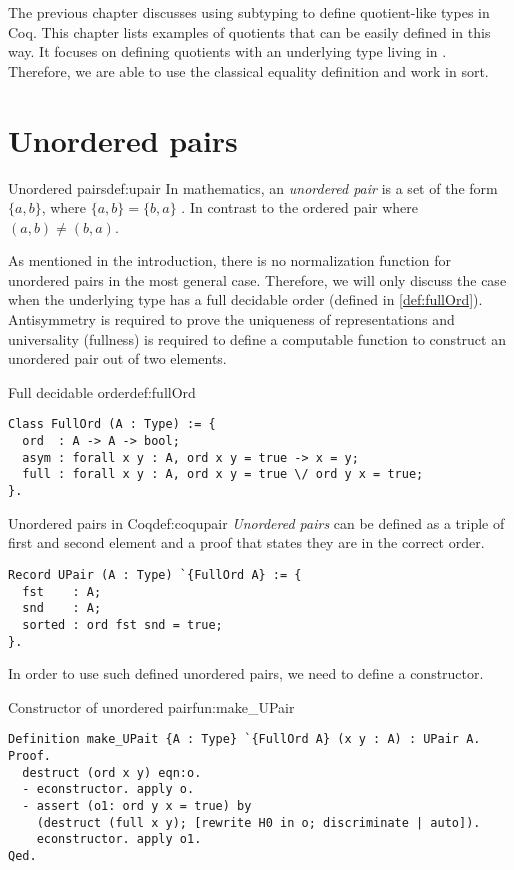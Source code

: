 The previous chapter discusses using subtyping to define quotient-like types in Coq. This chapter lists examples of quotients that can be easily defined in this way. It focuses on defining quotients with an underlying type living in . Therefore, we are able to use the classical equality definition and work in  sort.
\section{Unordered pairs}
\begin{defi}{Unordered pairs}{def:upair}
In mathematics, an \emph{unordered pair} is a set of the form $\{a, b\}$, where $\{a, b\} = \{b, a\}$ \cite{SetTheorey}. In contrast to the ordered pair where $(a, b) \neq (b, a)$.
\end{defi}
As mentioned in the introduction, there is no normalization function for unordered pairs in the most general case. Therefore, we will only discuss the case when the underlying type has a full decidable order (defined in \ref{def:fullOrd}). Antisymmetry is required to prove the uniqueness of representations and universality (fullness) is required to define a computable function to construct an unordered pair out of two elements.
\begin{defi}{Full decidable order}{def:fullOrd}
\begin{verbatim}
Class FullOrd (A : Type) := {
  ord  : A -> A -> bool;
  asym : forall x y : A, ord x y = true -> x = y;
  full : forall x y : A, ord x y = true \/ ord y x = true;
}.
\end{verbatim}
\end{defi}
\begin{defi}{Unordered pairs in Coq}{def:coqupair}
\emph{Unordered pairs} can be defined as a triple of first and second element and a proof that states they are in the correct order.
\begin{verbatim}
Record UPair (A : Type) `{FullOrd A} := {
  fst    : A;
  snd    : A;
  sorted : ord fst snd = true;
}.
\end{verbatim}
\end{defi}
In order to use such defined unordered pairs, we need to define a constructor.
\begin{func}{Constructor of unordered pair}{fun:make_UPair}
\begin{verbatim}
Definition make_UPait {A : Type} `{FullOrd A} (x y : A) : UPair A.
Proof.
  destruct (ord x y) eqn:o. 
  - econstructor. apply o.
  - assert (o1: ord y x = true) by
    (destruct (full x y); [rewrite H0 in o; discriminate | auto]).
    econstructor. apply o1.
Qed.
\end{verbatim}
\end{func}

